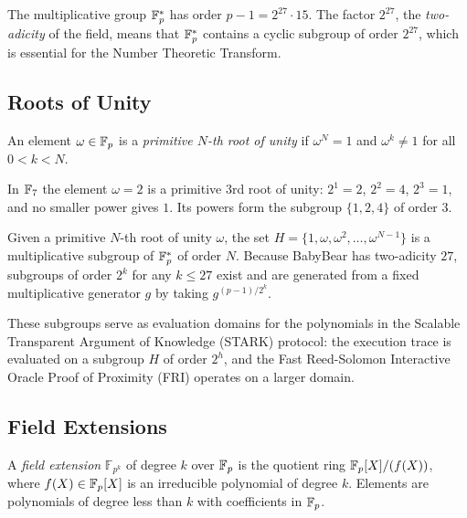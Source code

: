 The multiplicative group $\mathbb{F}_p^*$ has order $p - 1 = 2^{27} \cdot 15$.
The factor $2^{27}$, the \emph{two-adicity} of the field, means that
$\mathbb{F}_p^*$ contains a cyclic subgroup of order $2^{27}$, which is
essential for the Number Theoretic Transform.


\subsection{Roots of Unity}
\label{subsec:roots_of_unity}

\begin{definition}
\label{def:root_of_unity}
An element $\omega \in \mathbb{F}_p$ is a \emph{primitive $N$-th root of unity}
if $\omega^N = 1$ and $\omega^k \neq 1$ for all $0 < k < N$.
\end{definition}

\begin{example}
\label{ex:root_of_unity}
In $\mathbb{F}_7$ the element $\omega = 2$ is a primitive $3$rd root of unity:
$2^1 = 2$, $2^2 = 4$, $2^3 = 1$, and no smaller power gives $1$. Its
powers form the subgroup $\{1, 2, 4\}$ of order $3$.
\end{example}

Given a primitive $N$-th root of unity $\omega$, the set
$H = \{1, \omega, \omega^2, \ldots, \omega^{N-1}\}$
is a multiplicative subgroup of $\mathbb{F}_p^*$ of order $N$. Because BabyBear
has two-adicity $27$, subgroups of order $2^k$ for any $k \leq 27$
exist and are generated from a fixed multiplicative generator $g$ by
taking $g^{(p-1)/2^k}$.

These subgroups serve as evaluation domains for the polynomials in the
Scalable Transparent Argument of Knowledge (STARK) protocol: the execution trace is evaluated on a subgroup $H$ of
order $2^h$, and the Fast Reed-Solomon Interactive Oracle Proof of
Proximity (FRI) operates on a larger domain.


\subsection{Field Extensions}
\label{subsec:field_ext}

\begin{definition}
\label{def:field_ext}
A \emph{field extension} $\mathbb{F}_{p^k}$ of degree $k$ over $\mathbb{F}_p$
is the quotient ring $\mathbb{F}_p[X]/(f(X))$, where $f(X) \in \mathbb{F}_p[X]$ is an
irreducible polynomial of degree $k$. Elements are polynomials of
degree less than $k$ with coefficients in $\mathbb{F}_p$.
\end{definition}


